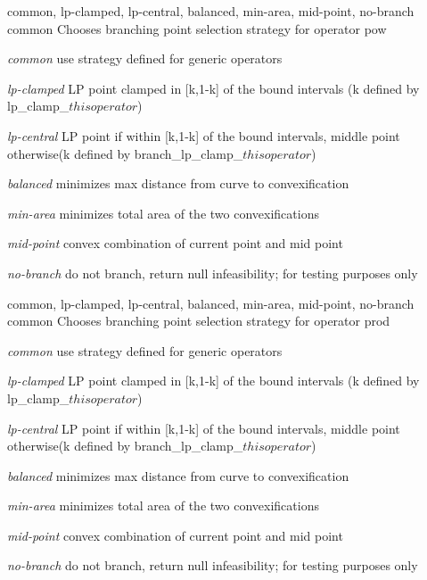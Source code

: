 %
{common, lp-clamped, lp-central, balanced, min-area, mid-point, no-branch}%
{common}%
{Chooses branching point selection strategy for operator pow}%
{\begin{list}{}{
\setlength{\parsep}{0em}
\setlength{\leftmargin}{3ex}
\setlength{\labelwidth}{1ex}
\setlength{\itemindent}{0ex}
\setlength{\topsep}{0pt}}
\item[\textit{common}] use strategy defined for generic operators
\item[\textit{lp-clamped}] LP point clamped in [k,1-k] of the bound intervals (k defined by lp\_clamp\_${this operator}$)
\item[\textit{lp-central}] LP point if within [k,1-k] of the bound intervals, middle point otherwise(k defined by branch\_lp\_clamp\_${this operator}$)
\item[\textit{balanced}] minimizes max distance from curve to convexification
\item[\textit{min-area}] minimizes total area of the two convexifications
\item[\textit{mid-point}] convex combination of current point and mid point
\item[\textit{no-branch}] do not branch, return null infeasibility; for testing purposes only
\end{list}
}

%
{common, lp-clamped, lp-central, balanced, min-area, mid-point, no-branch}%
{common}%
{Chooses branching point selection strategy for operator prod}%
{\begin{list}{}{
\setlength{\parsep}{0em}
\setlength{\leftmargin}{3ex}
\setlength{\labelwidth}{1ex}
\setlength{\itemindent}{0ex}
\setlength{\topsep}{0pt}}
\item[\textit{common}] use strategy defined for generic operators
\item[\textit{lp-clamped}] LP point clamped in [k,1-k] of the bound intervals (k defined by lp\_clamp\_${this operator}$)
\item[\textit{lp-central}] LP point if within [k,1-k] of the bound intervals, middle point otherwise(k defined by branch\_lp\_clamp\_${this operator}$)
\item[\textit{balanced}] minimizes max distance from curve to convexification
\item[\textit{min-area}] minimizes total area of the two convexifications
\item[\textit{mid-point}] convex combination of current point and mid point
\item[\textit{no-branch}] do not branch, return null infeasibility; for testing purposes only
\end{list}
}

